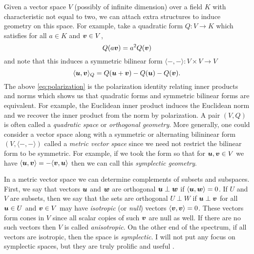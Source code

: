 Given a vector space $V$ (possibly of infinite dimension) over a field $K$ with characteristic not equal to two, we can attach extra structures to induce geometry on this space. For example, take a quadratic form $Q \colon V \to K$ which satisfies for all $a\in K$ and $\boldsymbol{v}\in V$,
\begin{equation}
Q(a\boldsymbol{v})=a^2Q(\boldsymbol{v})
\end{equation}
and note that this induces a symmetric bilinear form $\langle -,-\rangle \colon V\times V \to V$
\begin{equation}
\label{eq:polarization}
\langle \boldsymbol{u},\boldsymbol{v}\rangle_Q = Q(\boldsymbol{u}+\boldsymbol{v})-Q(\boldsymbol{u})-Q(\boldsymbol{v}).
\end{equation}
The above \cref{eq:polarization} is the polarization identity relating inner products and norms which shows us that quadratic forms and symmetric bilinear forms are equivalent. For example, the Euclidean inner product induces the Euclidean norm and we recover the inner product from the norm by polarization. A pair $(V,Q)$ is often called a \emph{quadratic space} or \emph{orthogonal geometry}. More generally, one could consider a vector space along with a symmetric or alternating bilininear form $(V,\langle -,- \rangle)$ called a \emph{metric vector space} since we need not restrict the bilinear form to be symmetric. For example, if we took the form so that for $\boldsymbol{u},\boldsymbol{v}\in V$ we have $\langle \boldsymbol{u},\boldsymbol{v}\rangle = -\langle \boldsymbol{v}, \boldsymbol{u}\rangle$ then we can call this \emph{symplectic geometry}. 

In a metric vector space we can determine complements of subsets and subspaces. First, we say that vectors $\boldsymbol{u}$ and $\boldsymbol{w}$ are orthogonal $\boldsymbol{u}\perp \boldsymbol{w}$ if $\langle \boldsymbol{u},\boldsymbol{w}\rangle=0$. If $U$ and $V$ are subsets, then we say that the sets are orthogonal $U \perp W$ if $\boldsymbol{u}\perp \boldsymbol{v}$ for all  $\boldsymbol{u} \in U$ and $\boldsymbol{v} \in V$ may have \emph{isotropic} (or \emph{null}) vectors $\langle \boldsymbol{v},\boldsymbol{v} \rangle = 0$. These vectors form cones in $V$ since all scalar copies of such $\boldsymbol{v}$ are null as well. If there are no such vectors then $V$ is called \emph{anisotropic}. On the other end of the spectrum, if all vectors are isotropic, then the space is \emph{symplectic}. I will not put any focus on symplectic spaces, but they are truly prolific and useful .

